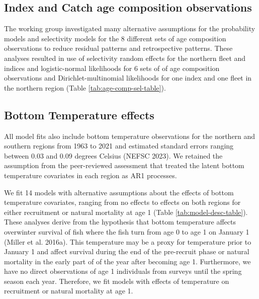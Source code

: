 \documentclass[
]{article}
\begin{document}
\hypertarget{index-and-catch-age-composition-observations}{%
\subsection*{Index and Catch age composition
observations}\label{index-and-catch-age-composition-observations}}

The working group investigated many alternative assumptions for the
probability models and selectivity models for the 8 different sets of
age composition observations to reduce residual patterns and
retrospective patterns. These analyses resulted in use of selectivity
random effects for the northern fleet and indices and logistic-normal
likelihoods for 6 sets of of age composition observations and
Dirichlet-multinomial likelihoods for one index and one fleet in the
northern region (Table \ref{tab:age-comp-sel-table}).

\hypertarget{bottom-temperature-effects}{%
\subsection*{Bottom Temperature
effects}\label{bottom-temperature-effects}}

All model fits also include bottom temperature observations for the
northern and southern regions from 1963 to 2021 and estimated standard
errors ranging between 0.03 and 0.09 degrees Celsius (NEFSC 2023). We
retained the assumption from the peer-reviewed assessment that treated
the latent bottom temperature covariates in each region as AR1
processes.

We fit 14 models with alternative assumptions about the effects of
bottom temperature covariates, ranging from no effects to effects on
both regions for either recruitment or natural mortality at age 1 (Table
\ref{tab:model-desc-table}). These analyses derive from the hypothesis
that bottom temperature affects overwinter survival of fish where the
fish turn from age 0 to age 1 on January 1 (Miller et al. 2016a). This
temperature may be a proxy for temperature prior to January 1 and affect
survival during the end of the pre-recruit phase or natural mortality in
the early part of of the year after becoming age 1. Furthermore, we have
no direct observations of age 1 individuals from surveys until the
spring season each year. Therefore, we fit models with effects of
temperature on recruitment or natural mortality at age 1.
\end{document}
